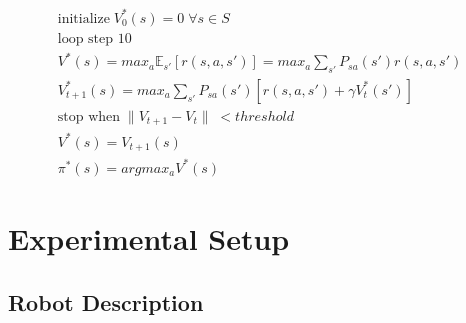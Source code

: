 \documentclass[fullpage]{article}
\begin{document}
\begin{gather}
\text{initialize} \; V_0^*(s) = 0 \; \forall s \in S \\
\text{loop step 10} \\
V^*(s) = {max}_a \mathbb{E}_{s'}[r(s, a, s')] = {max}_a \sum_{s'} P_{sa}(s') r(s, a, s') \\
V_{t+1}^*(s) = {max}_a \sum_{s'} P_{sa}(s') [r(s, a, s') + \gamma V_t^*(s')] \\
\text{stop when} \; \lVert V_{t+1} - V_t \lVert \; < threshold \\
V^*(s) = V_{t+1}(s) \\
\pi^*(s) = argmax_a V^*(s)
\end{gather}


\section{Experimental Setup}

\subsection{Robot Description}
\end{document}
